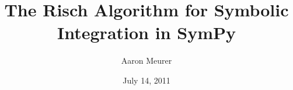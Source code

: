 \documentclass{beamer}
\title{The Risch Algorithm for Symbolic
Integration in SymPy}
\author{Aaron Meurer}
\date{July 14, 2011}
\numberwithin{equation}{section} %
\begin{document}
\begin{frame}
    \titlepage
\end{frame}

\end{document}
